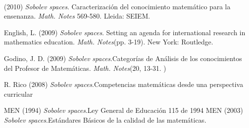 \begin{titlepage}
\begin{minipage}{0.85\linewidth}
\begin{minipage}{0.85\linewidth}
\begin{resumen}
    \end{resumen}
\end{minipage}
\vspace*{5pt}\\
\footnotesize
%  
    
\end{minipage}
\vspace{5pt}
\begin{thebibliography}{99}

 (2010) {\it Sobolev spaces}. Caracterizaci\'{o}n del conocimiento matem\'{a}tico para la ensenanza. \emph{Math. Notes} 569-580. Lleida: SEIEM.

 {\sc English, L.} (2009) {\it Sobolev spaces}. Setting an agenda for international research in mathematics education. \emph{Math. Notes}(pp. 3-19). New York: Routledge.

 {\sc Godino, J. D.} (2009) {\it Sobolev spaces}.Categor\'{i}as de An\'{a}lisis de los conocimientos del Profesor de Matem\'{a}ticas. \emph{Math. Notes}(20, 13-31. )

 {\sc R. Rico} (2008) {\it Sobolev spaces}.Competencias matem\'{a}ticas desde una perspectiva curricular

 {\sc MEN} (1994) {\it Sobolev spaces}.Ley General de Educaci\'{o}n 115 de 1994
 {\sc MEN} (2003) {\it Sobolev spaces}.Est\'{a}ndares B\'{a}sicos de la calidad de las matem\'{a}ticas.


\end{thebibliography}
\end{titlepage}
